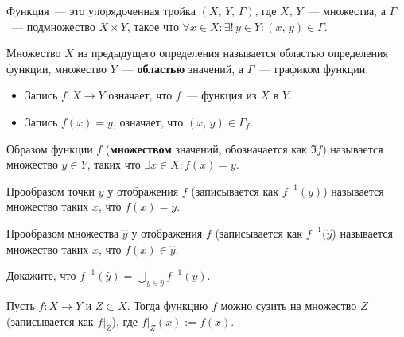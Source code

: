 \begin{definition}\label{def:intro-func}
  Функция~--- это упорядоченная тройка $(X,\,Y,\,\Gamma)$, где $X$, $Y$~--- множества, а $\Gamma$~--- подмножество $X \times Y$, такое что $\forall x \in X\colon \exists!\,y\in Y\colon (x,\,y) \in \Gamma$.
\end{definition}

\begin{definition}\label{def:intro-func2}
  Множество $X$ из предыдущего определения называется областью определения функции, множество $Y$~--- \textbf{областью} значений, а $\Gamma$~--- графиком функции.
\end{definition}

\begin{definition}\label{def:intro-funchealth}\slashn
  \begin{itemize}
  \item Запись $f\colon X \to Y$ означает, что $f$~--- функция из $X$ в $Y$.
  \item Запись $f(x) = y$, означает, что $(x,\,y) \in \Gamma_f$.
  \end{itemize}
\end{definition}

\begin{definition}\label{def:intro-funcim}
  Образом функции $f$ (\textbf{множеством} значений, обозначается как $\Im f$) называется множество $y \in Y$, таких что $\exists x \in X\colon f(x) = y$.
\end{definition}

\begin{definition}\label{def:intro-funcpreim}
  Прообразом точки $y$ у отображения $f$ (записывается как $f^{-1}(y)$) называется множество таких $x$, что $f(x) = y$.
\end{definition}

\begin{definition}\label{def:intro-funcpreim2}
  Прообразом множества $\hat{y}$ у отображения $f$ (записывается как $f^{-1}(\hat{y}$) называется множество таких $x$, что $f(x) \in \hat{y}$.
\end{definition}

\exersize Докажите, что $f^{-1}(\hat{y}) = \bigcup\limits_{y \in \hat{y}} f^{-1}(y)$.

\begin{definition}\label{def:intro-funcnarrow}
  Пусть $f\colon X \to Y$ и $Z \subset X$. Тогда функцию $f$ можно сузить на множество $Z$ (записывается как $f|_Z$), где $f|_{Z}(x) := f(x)$.
\end{definition}

